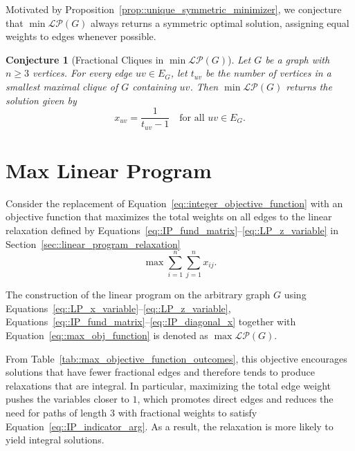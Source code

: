 \documentclass[11pt]{report}
\newtheorem{conjecture}{Conjecture}
\begin{document}
Motivated by Proposition~\ref{prop::unique_symmetric_minimizer}, we conjecture that $\min\mathcal{LP}(G)$ always returns a symmetric optimal solution, assigning equal weights to edges whenever possible.

\begin{conjecture}[Fractional Cliques in $\min \mathcal{LP}(G)$] \label{conjecture::fractional_cliques_min_LP}
  Let $G$ be a graph with $n\geq 3$ vertices. For every edge $uv\in E_G$, let $t_{uv}$ be the number of vertices in a smallest maximal clique of $G$ containing $uv$. Then $\min\mathcal{LP}(G)$ returns the solution given by
  \[
  x_{uv}=\frac{1}{t_{uv}-1} \quad \text{for all } uv \in E_G.
  \]
\end{conjecture}


\section{Max Linear Program} \label{sec::max_linear_program}

Consider the replacement of Equation~\ref{eq::integer_objective_function} with an objective function that maximizes the total weights on all edges to the linear relaxation defined by Equations~\eqref{eq::IP_fund_matrix}--\eqref{eq::LP_z_variable} in Section~\ref{sec::linear_program_relaxation} 
\begin{equation} \label{eq::max_obj_function}
  \max \sum_{i=1}^{n} \sum_{j=1}^{n} x_{ij}.
\end{equation}

The construction of the linear program on the arbitrary graph $G$ using Equations~\eqref{eq::LP_x_variable}--\eqref{eq::LP_z_variable}, Equations~\eqref{eq::IP_fund_matrix}--\eqref{eq::IP_diagonal_x} together with Equation~\eqref{eq::max_obj_function} is denoted as $\max \mathcal{LP}(G)$. 

From Table~\ref{tab::max_objective_function_outcomes}, this objective encourages solutions that have fewer fractional edges and therefore tends to produce relaxations that are integral. In particular, maximizing the total edge weight pushes the variables closer to $1$, which promotes direct edges and reduces the need for paths of length $3$ with fractional weights to satisfy Equation~\eqref{eq::IP_indicator_arg}. As a result, the relaxation is more likely to yield integral solutions.  
\end{document}
